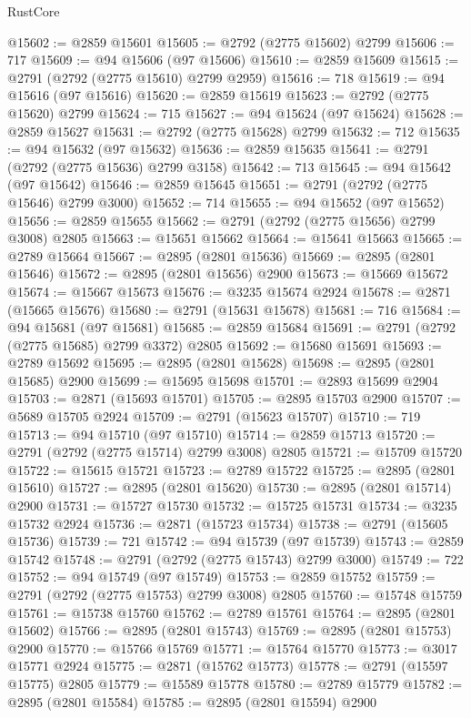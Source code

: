 \begin{lexlean}{RustCore}
\begin{coremodule}
@15602 := @2859 @15601
@15605 := @2792 (@2775 @15602) @2799
@15606 := 717
@15609 := @94 @15606 (@97 @15606)
@15610 := @2859 @15609
@15615 := @2791 (@2792 (@2775 @15610) @2799 @2959)
@15616 := 718
@15619 := @94 @15616 (@97 @15616)
@15620 := @2859 @15619
@15623 := @2792 (@2775 @15620) @2799
@15624 := 715
@15627 := @94 @15624 (@97 @15624)
@15628 := @2859 @15627
@15631 := @2792 (@2775 @15628) @2799
@15632 := 712
@15635 := @94 @15632 (@97 @15632)
@15636 := @2859 @15635
@15641 := @2791 (@2792 (@2775 @15636) @2799 @3158)
@15642 := 713
@15645 := @94 @15642 (@97 @15642)
@15646 := @2859 @15645
@15651 := @2791 (@2792 (@2775 @15646) @2799 @3000)
@15652 := 714
@15655 := @94 @15652 (@97 @15652)
@15656 := @2859 @15655
@15662 := @2791 (@2792 (@2775 @15656) @2799 @3008) @2805
@15663 := @15651 @15662
@15664 := @15641 @15663
@15665 := @2789 @15664
@15667 := @2895 (@2801 @15636)
@15669 := @2895 (@2801 @15646)
@15672 := @2895 (@2801 @15656) @2900
@15673 := @15669 @15672
@15674 := @15667 @15673
@15676 := @3235 @15674 @2924
@15678 := @2871 (@15665 @15676)
@15680 := @2791 (@15631 @15678)
@15681 := 716
@15684 := @94 @15681 (@97 @15681)
@15685 := @2859 @15684
@15691 := @2791 (@2792 (@2775 @15685) @2799 @3372) @2805
@15692 := @15680 @15691
@15693 := @2789 @15692
@15695 := @2895 (@2801 @15628)
@15698 := @2895 (@2801 @15685) @2900
@15699 := @15695 @15698
@15701 := @2893 @15699 @2904
@15703 := @2871 (@15693 @15701)
@15705 := @2895 @15703 @2900
@15707 := @5689 @15705 @2924
@15709 := @2791 (@15623 @15707)
@15710 := 719
@15713 := @94 @15710 (@97 @15710)
@15714 := @2859 @15713
@15720 := @2791 (@2792 (@2775 @15714) @2799 @3008) @2805
@15721 := @15709 @15720
@15722 := @15615 @15721
@15723 := @2789 @15722
@15725 := @2895 (@2801 @15610)
@15727 := @2895 (@2801 @15620)
@15730 := @2895 (@2801 @15714) @2900
@15731 := @15727 @15730
@15732 := @15725 @15731
@15734 := @3235 @15732 @2924
@15736 := @2871 (@15723 @15734)
@15738 := @2791 (@15605 @15736)
@15739 := 721
@15742 := @94 @15739 (@97 @15739)
@15743 := @2859 @15742
@15748 := @2791 (@2792 (@2775 @15743) @2799 @3000)
@15749 := 722
@15752 := @94 @15749 (@97 @15749)
@15753 := @2859 @15752
@15759 := @2791 (@2792 (@2775 @15753) @2799 @3008) @2805
@15760 := @15748 @15759
@15761 := @15738 @15760
@15762 := @2789 @15761
@15764 := @2895 (@2801 @15602)
@15766 := @2895 (@2801 @15743)
@15769 := @2895 (@2801 @15753) @2900
@15770 := @15766 @15769
@15771 := @15764 @15770
@15773 := @3017 @15771 @2924
@15775 := @2871 (@15762 @15773)
@15778 := @2791 (@15597 @15775) @2805
@15779 := @15589 @15778
@15780 := @2789 @15779
@15782 := @2895 (@2801 @15584)
@15785 := @2895 (@2801 @15594) @2900

\end{coremodule}
\end{lexlean}
